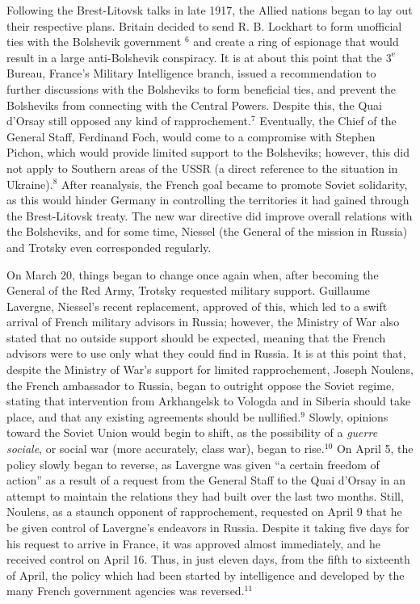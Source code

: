 \begin{justify}
  \hspace{.5 in} Following the Brest-Litovsk talks in late 1917, the Allied nations began to lay out their respective plans. Britain decided to send R. B. Lockhart to form unofficial ties with the Bolshevik government $^{6}$ and create a ring of espionage that would result in a large anti-Bolshevik conspiracy. It is at about this point that the $3^{\text{e}}$ Bureau, France's Military Intelligence branch, issued a recommendation to further discussions with the Bolsheviks to form beneficial ties, and prevent the Bolsheviks from connecting with the Central Powers. Despite this, the Quai d'Orsay still opposed any kind of rapprochement.$^{7}$ Eventually, the Chief of the General Staff, Ferdinand Foch, would come to a compromise with Stephen Pichon, which would provide limited support to the Bolsheviks; however, this did not apply to Southern areas of the USSR (a direct reference to the situation in Ukraine).$^{8}$ After reanalysis, the French goal became to promote Soviet solidarity, as this would hinder Germany in controlling the territories it had gained through the Brest-Litovsk treaty. The new war directive did improve overall relations with the Bolsheviks, and for some time, Niessel (the General of the mission in Russia) and Trotsky even corresponded regularly. 

  \hspace{.5 in} On March 20, things began to change once again when, after becoming the General of the Red Army, Trotsky requested military support. Guillaume Lavergne, Niessel's recent replacement, approved of this, which led to a swift arrival of French military advisors in Russia; however, the Ministry of War also stated that no outside support should be expected, meaning that the French advisors were to use only what they could find in Russia. It is at this point that, despite the Ministry of War's support for limited rapprochement, Joseph Noulens, the French ambassador to Russia, began to outright oppose the Soviet regime, stating that intervention from Arkhangelsk to Vologda and in Siberia should take place, and that any existing agreements should be nullified.$^{9}$ Slowly, opinions toward the Soviet Union would begin to shift, as the possibility of a \textit{guerre sociale}, or social war (more accurately, class war), began to rise.$^{10}$ On April 5, the policy slowly began to reverse, as Lavergne was given ``a certain freedom of action'' as a result of a request from the General Staff to the Quai d'Orsay in an attempt to maintain the relations they had built over the last two months. Still, Noulens, as a staunch opponent of rapprochement, requested on April 9 that he be given control of Lavergne's endeavors in Russia. Despite it taking five days for his request to arrive in France, it was approved almost immediately, and he received control on April 16. Thus, in just eleven days, from the fifth to sixteenth of April, the policy which had been started by intelligence and developed by the many French government agencies was reversed.$^{11}$


\end{justify}
